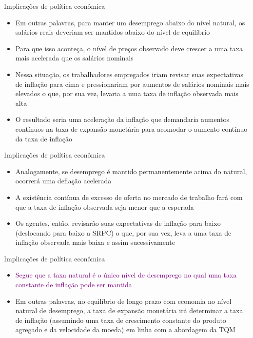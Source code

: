 \documentclass[10pt]{beamer}
\begin{document}
\begin{frame}{Implicações de política econômica}
    \begin{itemize}
        \item Em outras palavras, para manter um desemprego abaixo do nível natural, os salários reais deveriam ser mantidos abaixo do nível de equilíbrio
        \bigskip
        \item Para que isso aconteça, o nível de preços observado deve crescer a uma taxa mais acelerada que os salários nominais
        \bigskip
        \item Nessa situação, os trabalhadores empregados iriam revisar suas expectativas de inflação para cima e pressionariam por aumentos de salários nominais mais elevados o que, por sua vez, levaria a uma taxa de inflação observada mais alta
        \bigskip
        \item O resultado seria uma aceleração da inflação que demandaria aumentos contínuos na taxa de expansão monetária para acomodar o aumento contínuo da taxa de inflação
    \end{itemize}    
\end{frame}

\begin{frame}{Implicações de política econômica}
    \begin{itemize}
        \item Analogamente, se desemprego é mantido permanentemente acima do natural, ocorrerá uma deflação acelerada
        \bigskip
        \item A existência contínua de excesso de oferta no mercado de trabalho fará com que a taxa de inflação observada seja menor que a esperada
        \bigskip
        \item Os agentes, então, revisarão suas expectativas de inflação para baixo (deslocando para baixo a SRPC) o que, por sua vez, leva a uma taxa de inflação observada mais baixa e assim sucessivamente
    \end{itemize}    
\end{frame}

\begin{frame}{Implicações de política econômica}
    \begin{itemize}
        \item \textcolor{purple}{Segue que a taxa natural é o único nível de desemprego no qual uma taxa constante de inflação pode ser mantida}
        \bigskip
        \item Em outras palavras, no equilíbrio de longo prazo com economia no nível natural de desemprego, a taxa de expansão monetária irá determinar a taxa de inflação (assumindo uma taxa de crescimento constante do produto agregado e da velocidade da moeda) em linha com a abordagem da TQM
    \end{itemize}    
\end{frame}
\end{document}
